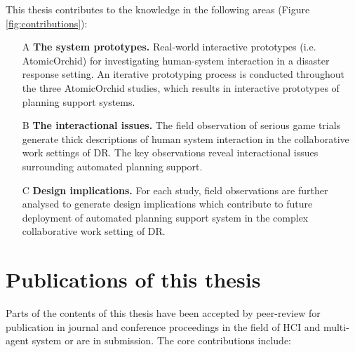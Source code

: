 This thesis contributes to the knowledge in the following areas (Figure \ref{fig:contributions}): \\

\begin{enumerate}
  \item[A] \textbf{The system prototypes.} Real-world interactive prototypes (i.e. AtomicOrchid) for investigating human-system interaction in a disaster response setting. An iterative prototyping process is conducted throughout the three AtomicOrchid studies, which results in interactive prototypes of planning support systems. 
  
  \item[B] \textbf{The interactional issues.} The field observation of serious game trials generate thick descriptions of human system interaction in the collaborative work settings of \ac{DR}. The key observations reveal interactional issues surrounding automated planning support.
  
  \item[C] \textbf{Design implications.} For each study, field observations are further analysed to generate design implications which contribute to future deployment of automated planning support system in the complex collaborative work setting of \ac{DR}. 
\end{enumerate}


\section{Publications of this thesis} 
Parts of the contents of this thesis have been accepted by peer-review for publication in journal and conference proceedings in the field of \ac{HCI} and multi-agent system or are in submission. The core contributions include: \\


